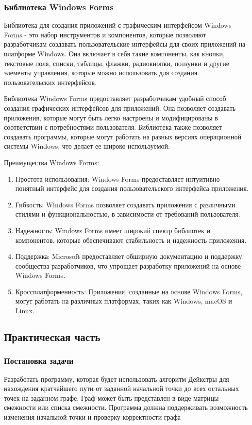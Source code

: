 \documentclass[a4paper,14pt, Times New Roman]{extarticle}
\begin{document}
\subsubsection{Библиотека Windows Forms}

Библиотека для создания приложений с графическим интерфейсом Windows Forms - это набор инструментов и компонентов, которые позволяют разработчикам создавать пользовательские интерфейсы для своих приложений на платформе Windows. Она включает в себя такие компоненты, как кнопки, текстовые поля, списки, таблицы, флажки, радиокнопки, ползунки и другие элементы управления, которые можно использовать для создания пользовательских интерфейсов.

Библиотека Windows Forms предоставляет разработчикам удобный способ создания графических интерфейсов для приложений. Она позволяет создавать приложения, которые могут быть легко настроены и модифицированы в соответствии с потребностями пользователя. Библиотека также позволяет создавать программы, которые могут работать на разных версиях операционной системы Windows, что делает ее широко используемой.

Преимущества Windows Forms:

\begin{enumerate}
  \item Простота использования: Windows Forms предоставляет интуитивно понятный интерфейс для создания пользовательского интерфейса приложения.
  \item Гибкость: Windows Forms позволяет создавать приложения с различными стилями и функциональностью, в зависимости от требований пользователя.
  \item Надежность: Windows Forms имеет широкий спектр библиотек и компонентов, которые обеспечивают стабильность и надежность приложения.
  \item Поддержка: Microsoft предоставляет обширную документацию и поддержку сообщества разработчиков, что упрощает разработку приложений на основе Windows Forms.
  \item Кроссплатформенность: Приложения, созданные на основе Windows Forms, могут работать на различных платформах, таких как Windows, macOS и Linux.
\end{enumerate}

\subsection{Практическая часть}

\subsubsection{Постановка задачи}
Разработать программу, которая будет использовать алгоритм Дейкстры для нахождения кратчайшего пути от заданной начальной точки до всех остальных точек на заданном графе. Граф может быть представлен в виде матрицы смежности или списка смежности. Программа должна поддерживать возможность изменения начальной точки и проверку корректности графа
\end{document}
